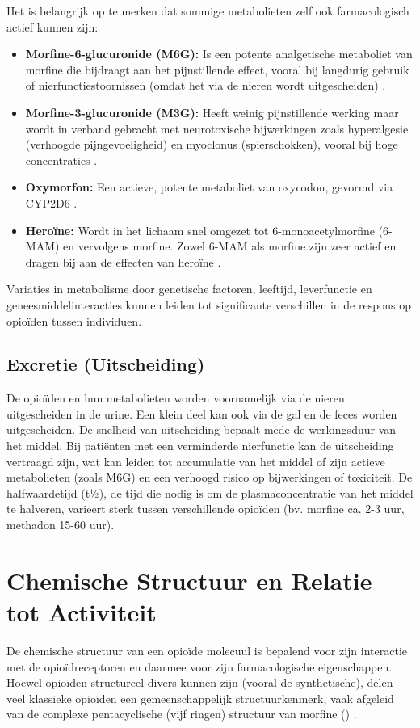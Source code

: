 \documentclass[11pt, a4paper]{report} %
\begin{document}
Het is belangrijk op te merken dat sommige metabolieten zelf ook farmacologisch actief kunnen zijn:
\begin{itemize}
    \item \textbf{Morfine-6-glucuronide (M6G):} Is een potente analgetische metaboliet van morfine die bijdraagt aan het pijnstillende effect, vooral bij langdurig gebruik of nierfunctiestoornissen (omdat het via de nieren wordt uitgescheiden) \parencite{Frontiers2022M3G}.
    \item \textbf{Morfine-3-glucuronide (M3G):} Heeft weinig pijnstillende werking maar wordt in verband gebracht met neurotoxische bijwerkingen zoals hyperalgesie (verhoogde pijngevoeligheid) en myoclonus (spierschokken), vooral bij hoge concentraties \parencite{Frontiers2022M3G}.
    \item \textbf{Oxymorfon:} Een actieve, potente metaboliet van oxycodon, gevormd via CYP2D6 \parencite{PMC2019OxycodonePathway}.
    \item \textbf{Heroïne:} Wordt in het lichaam snel omgezet tot 6-monoacetylmorfine (6-MAM) en vervolgens morfine. Zowel 6-MAM als morfine zijn zeer actief en dragen bij aan de effecten van heroïne \parencite{Gupta2010ChemistryOpioids}.
\end{itemize}
Variaties in metabolisme door genetische factoren, leeftijd, leverfunctie en geneesmiddelinteracties kunnen leiden tot significante verschillen in de respons op opioïden tussen individuen.

\subsection{Excretie (Uitscheiding)}
De opioïden en hun metabolieten worden voornamelijk via de nieren uitgescheiden in de urine. Een klein deel kan ook via de gal en de feces worden uitgescheiden. De snelheid van uitscheiding bepaalt mede de werkingsduur van het middel. Bij patiënten met een verminderde nierfunctie kan de uitscheiding vertraagd zijn, wat kan leiden tot accumulatie van het middel of zijn actieve metabolieten (zoals M6G) en een verhoogd risico op bijwerkingen of toxiciteit. De halfwaardetijd (t½), de tijd die nodig is om de plasmaconcentratie van het middel te halveren, varieert sterk tussen verschillende opioïden (bv. morfine ca. 2-3 uur, methadon 15-60 uur).

\section{Chemische Structuur en Relatie tot Activiteit}
De chemische structuur van een opioïde molecuul is bepalend voor zijn interactie met de opioïdreceptoren en daarmee voor zijn farmacologische eigenschappen. Hoewel opioïden structureel divers kunnen zijn (vooral de synthetische), delen veel klassieke opioïden een gemeenschappelijk structuurkenmerk, vaak afgeleid van de complexe pentacyclische (vijf ringen) structuur van morfine () \parencite{PubChem-morphine}.
\end{document}
